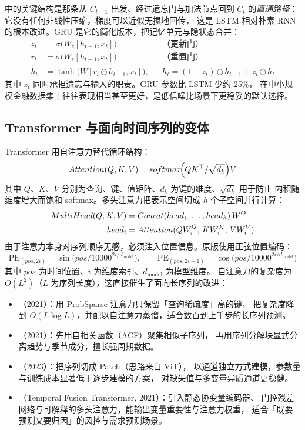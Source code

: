  中的关键结构是那条从 $C_{t-1}$ 出发、经过遗忘门与加法节点回到 $C_t$
的\emph{直通路径}：它没有任何非线性压缩，梯度可以近似无损地回传，
这是 LSTM 相对朴素 RNN 的根本改进。GRU 是它的简化版本，把记忆单元与隐状态合并：
\begin{align}
  z_t&=\sigma\bigl(W_z[h_{t-1},x_t]\bigr) && \text{（更新门）}\\
  r_t&=\sigma\bigl(W_r[h_{t-1},x_t]\bigr) && \text{（重置门）}\\
  \tilde{h}_t&=\tanh\bigl(W[r_t\odot h_{t-1},x_t]\bigr), && h_t=(1-z_t)\odot h_{t-1}+z_t\odot\tilde{h}_t
\end{align}
其中 $z_t$ 同时承担遗忘与输入的职责。GRU 参数比 LSTM 少约 25\%，
在中小规模金融数据集上往往表现相当甚至更好，是低信噪比场景下更稳妥的默认选择。

\subsection{Transformer 与面向时间序列的变体}

Transformer 用自注意力替代循环结构：
\begin{equation}\label{eq:09-attention}
  \mathrm{Attention}(Q,K,V)=\mathrm{softmax}\!\Bigl(\frac{QK^{\top}}{\sqrt{d_k}}\Bigr)V
\end{equation}
其中 $Q$、$K$、$V$ 分别为查询、键、值矩阵、$d_k$ 为键的维度、$\sqrt{d_k}$ 用于防止
内积随维度增大而饱和 softmax。多头注意力把表示空间切成 $h$ 个子空间并行计算：
\begin{align}\label{eq:09-multihead}
  \mathrm{MultiHead}(Q,K,V)&=\mathrm{Concat}(\mathrm{head}_1,\dots,\mathrm{head}_h)\,W^{O}\notag\\
  \mathrm{head}_i&=\mathrm{Attention}(QW_i^{Q},\,KW_i^{K},\,VW_i^{V})
\end{align}
由于注意力本身对序列顺序无感，必须注入位置信息。原版使用正弦位置编码：
\begin{equation}\label{eq:09-posenc}
  \mathrm{PE}_{(pos,2i)}=\sin\!\bigl(pos/10000^{2i/d_{\mathrm{model}}}\bigr),\qquad
  \mathrm{PE}_{(pos,2i+1)}=\cos\!\bigl(pos/10000^{2i/d_{\mathrm{model}}}\bigr)
\end{equation}
其中 $pos$ 为时间位置、$i$ 为维度索引、$d_{\mathrm{model}}$ 为模型维度。
自注意力的复杂度为 $O(L^2)$（$L$ 为序列长度），这直接催生了面向长序列的改进：

\begin{itemize}[leftmargin=*]
  \item {}（2021）：用 ProbSparse 注意力只保留「查询稀疏度」高的键，
  把复杂度降到 $O(L\log L)$，并配以自注意力蒸馏，适合数百到上千步的长序列预测。
  \item {}（2021）：先用自相关函数（ACF）聚集相似子序列，
  再用序列分解块显式分离趋势与季节成分，擅长强周期数据。
  \item {}（2023）：把序列切成 Patch（思路来自 ViT），
  以通道独立方式建模，参数量与训练成本显著低于逐步建模的方案，
  对缺失值与多变量异质通道更稳健。
  \item {}（Temporal Fusion Transformer, 2021）：引入静态协变量编码器、
  门控残差网络与可解释的多头注意力，能输出变量重要性与注意力权重，
  适合「既要预测又要归因」的风控与需求预测场景。
\end{itemize}

